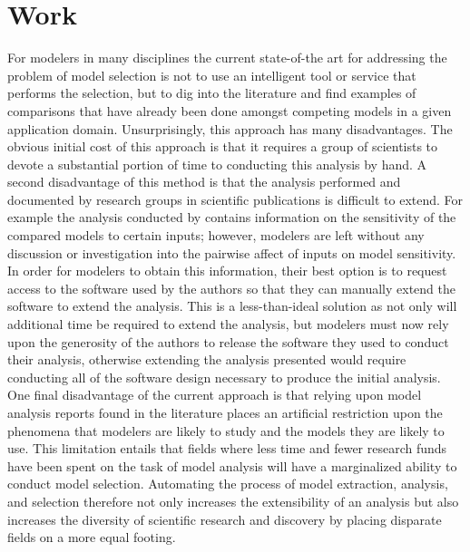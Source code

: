 \section{ Work\label{sec:prior_work}}  %
For modelers in many disciplines the current state-of-the art for addressing the problem of model selection is not to use an intelligent tool or service that performs the selection, but to dig into the literature and find examples of  comparisons that have already been done amongst competing models in a given application domain.
Unsurprisingly, this approach has many disadvantages.
The obvious initial cost of this approach is that it requires a group of scientists to devote a substantial portion of time to conducting this analysis by hand.
A second disadvantage of this method is that the analysis performed and documented by research groups in scientific publications is difficult to extend.
For example the analysis conducted by \citet{camargo2016six} contains information on the sensitivity of the compared models to certain inputs; however, modelers are left without any discussion or investigation into the pairwise affect of inputs on model sensitivity.
In order for modelers to obtain this information, their best option is to request access to the software used by the authors so that they can manually extend the software to extend the analysis.
This is a less-than-ideal solution as not only will additional time be required to extend the analysis, but modelers must now rely upon the generosity of the authors to release the software they used to conduct their analysis, otherwise extending the analysis presented would require conducting all of the software design necessary to produce the initial analysis. One final disadvantage of the current approach is that relying upon model analysis reports found in the literature places an artificial restriction upon the phenomena that modelers are likely to study and the models they are likely to use.
This limitation entails that fields where less time and fewer research funds have been spent on the task of model analysis will have a marginalized ability to conduct model selection.
Automating the process of model extraction, analysis, and selection therefore not only increases the extensibility of an analysis but also increases the diversity of scientific research and discovery by placing disparate fields on a more equal footing.


